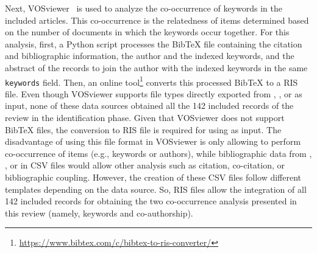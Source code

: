 Next, VOSviewer~\parencite{results:vosviewer:1,results:vosviewer:2} is used to analyze the co-occurrence of keywords in the included articles. This co-occurrence is the relatedness of items determined based on the number of documents in which the keywords occur together.
For this analysis, first, a Python script processes the BibTeX file containing the citation and bibliographic information, the author and the indexed keywords, and the abstract of the records to join the author with the indexed keywords in the same \texttt{keywords} field. Then, an online tool\footnote{\url{https://www.bibtex.com/c/bibtex-to-ris-converter/}} converts this processed BibTeX to a RIS file.
Even though VOSviewer supports file types directly exported from , , or  as input, none of these data sources obtained all the 142 included records of the review in the identification phase. Given that VOSviewer does not support BibTeX files, the conversion to RIS file is required for using as input.
The disadvantage of using this file format in VOSviewer is only allowing to perform co-occurrence of items (e.g., keywords or authors), while bibliographic data from , , or  in CSV files would allow other analysis such as citation, co-citation, or bibliographic coupling.
However, the creation of these CSV files follow different templates depending on the data source. So, RIS files allow the integration of all 142 included records for obtaining the two co-occurrence analysis presented in this review (namely, keywords and co-authorship).

